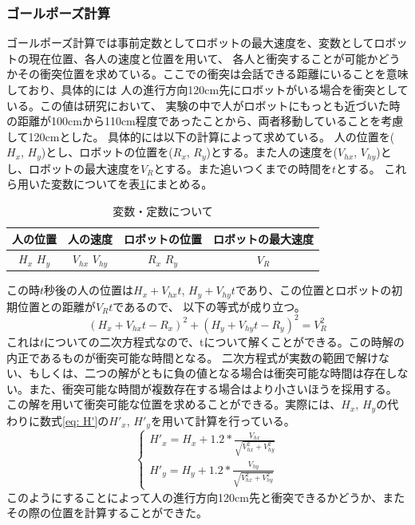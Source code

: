 \documentclass{kuisthesis}
\begin{document}
\subsubsection{ゴールポーズ計算}
ゴールポーズ計算では事前定数としてロボットの最大速度を、変数としてロボットの現在位置、各人の速度と位置を用いて、
各人と衝突することが可能かどうかその衝突位置を求めている。ここでの衝突は会話できる距離にいることを意味しており、具体的には
人の進行方向120cm先にロボットがいる場合を衝突としている。この値は研究\cite{mumm2011human}において、
実験の中で人がロボットにもっとも近づいた時の距離が100cmから110cm程度であったことから、両者移動していることを考慮して120cmとした。
具体的には以下の計算によって求めている。
人の位置を($H_x$, $H_y$)とし、ロボットの位置を($R_x$, $R_y$)とする。また人の速度を($V_{hx}$, $V_{hy}$)とし、ロボットの最大速度を$V_R$とする。また追いつくまでの時間を$t$とする。
これら用いた変数についてを表\ref{fig: variable}にまとめる。
\begin{table}[H]
  \centering
  \caption{変数・定数について}
  \label{fig: variable}
  \begin{tabular}{|c|c|c|c|}
    \hline
    人の位置 & 人の速度 & ロボットの位置 & ロボットの最大速度 \\ \hline
    $H_x$  $H_y$ & $V_{hx}$  $V_{hy}$ & $R_x$  $R_y$ & $V_R$ \\ \hline
  \end{tabular}
  
\end{table}
この時$t$秒後の人の位置は$H_x + V_{hx}t$, $H_y + V_{hy}t$であり、この位置とロボットの初期位置との距離が$V_Rt$であるので、
以下の等式が成り立つ。\begin{equation}(H_x + V_{hx}t - R_x)^{2} + (H_y + V_{hy}t - R_y)^2 = V_R^2\end{equation}
これは$t$についての二次方程式なので、tについて解くことができる。この時解の内正であるものが衝突可能な時間となる。
二次方程式が実数の範囲で解けない、もしくは、二つの解がともに負の値となる場合は衝突可能な時間は存在しない。また、衝突可能な時間が複数存在する場合はより小さいほうを採用する。
この解を用いて衝突可能な位置を求めることができる。実際には、$H_x$, $H_y$の代わりに数式\ref{eq: H'}の$H'_x$, $H'_y$を用いて計算を行っている。
\begin{equation}
  \label{eq: H'}
\left\{\begin{array}{l}
H'_x = H_x + 1.2*\frac{V_{hx}}{\sqrt{{V_{hx}^2 + V_{hy}^2}}}\\
H'_y = H_y + 1.2 * \frac{V_{hy}}{\sqrt{V_{hx}^2 + V_{hy}^2}}
\end{array}\right.
\end{equation}
このようにすることによって人の進行方向120cm先と衝突できるかどうか、またその際の位置を計算することができた。
\end{document}
